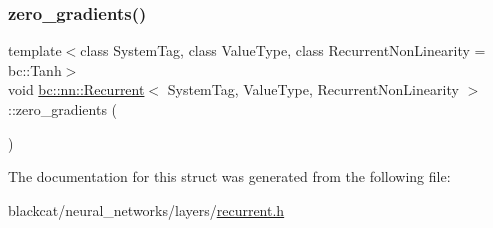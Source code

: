 \mbox{\label{structbc_1_1nn_1_1Recurrent_ad1872c1a70b6fe5e576452b694c29153}} 
\subsubsection{\texorpdfstring{zero\+\_\+gradients()}{zero\_gradients()}}
{\footnotesize\ttfamily template$<$class System\+Tag, class Value\+Type, class Recurrent\+Non\+Linearity = bc\+::\+Tanh$>$ \\
void \hyperlink{structbc_1_1nn_1_1Recurrent}{bc\+::nn\+::\+Recurrent}$<$ System\+Tag, Value\+Type, Recurrent\+Non\+Linearity $>$\+::zero\+\_\+gradients (\begin{DoxyParamCaption}{ }\end{DoxyParamCaption})\hspace{0.3cm}{\ttfamily [inline]}}



The documentation for this struct was generated from the following file\+:\begin{DoxyCompactItemize}
\item 
blackcat/neural\+\_\+networks/layers/\hyperlink{recurrent_8h}{recurrent.\+h}\end{DoxyCompactItemize}
